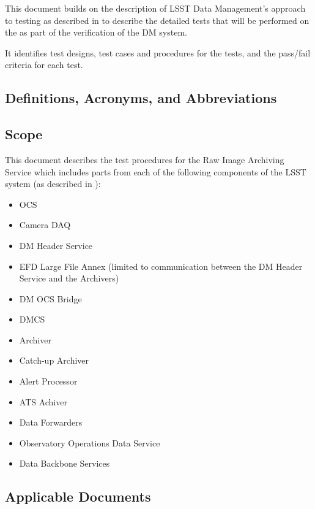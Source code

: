 \documentclass[DM,lsstdraft,STS,toc]{lsstdoc}
\begin{document}
This document builds on the description of LSST Data Management's
approach to testing as described in  to describe
the detailed tests that will be performed on the \product{} as part
of the verification of the DM system.


It identifies test designs, test cases and procedures for the tests,
and the pass/fail criteria for each test.

\subsection{Definitions, Acronyms, and Abbreviations \label{sec:acronyms}}


\subsection{Scope}
\label{sec:scope}


This document describes the test procedures for the Raw Image Archiving Service
which includes parts from each of the following components of the LSST system
(as described in ):


\begin{itemize}

\item{OCS}
\item{Camera DAQ}
\item{DM Header Service}
\item{EFD Large File Annex (limited to communication between the DM Header Service and the Archivers)}
\item{DM OCS Bridge}
\item{DMCS}
\item{Archiver}
\item{Catch-up Archiver}
\item{Alert Processor}
\item{ATS Achiver}
\item{Data Forwarders}
\item{Observatory Operations Data Service}
\item{Data Backbone Services}


\end{itemize}


\subsection{Applicable Documents}
\label{sec:docs}


\addtocounter{table}{-1}
\end{document}
